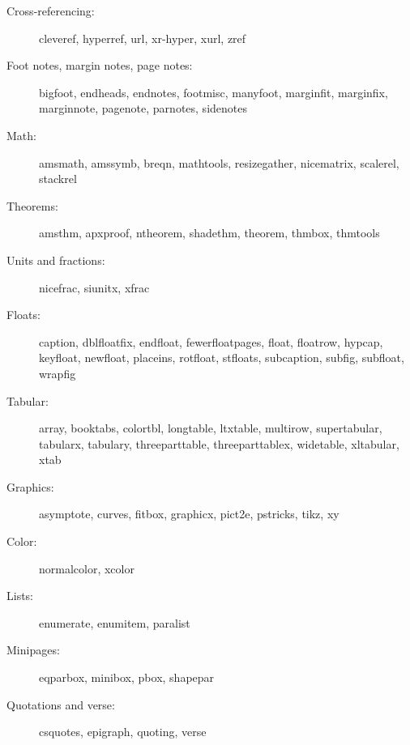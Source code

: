 \documentclass{article}
\def\pkg#1{#1}%
\renewcommand*{\pkg}[1]{#1}
\begin{document}
\begin{multicols}{2}
\begin{description}
\item[Cross-referencing:] \pkg{cleveref}, \pkg{hyperref}, \pkg{url}, \pkg{xr-hyper},
    \pkg{xurl}, \pkg{zref}

\item[Foot notes, margin notes, page notes:]
    \pkg{bigfoot}, \pkg{endheads}, \pkg{endnotes}, \pkg{footmisc},
    \pkg{manyfoot}, \pkg{marginfit}, \pkg{marginfix}, \pkg{marginnote},
    \pkg{pagenote}, \pkg{parnotes}, \pkg{sidenotes}

\item[Math:] \pkg{amsmath}, \pkg{amssymb}, \pkg{breqn}, \pkg{mathtools},
    \pkg{resizegather}, \pkg{nicematrix}, \pkg{scalerel}, \pkg{stackrel}

\item[Theorems:]
    \pkg{amsthm}, \pkg{apxproof}, \pkg{ntheorem}, \pkg{shadethm},
    \pkg{theorem}, \pkg{thmbox}, \pkg{thmtools}

\item[Units and fractions:] \pkg{nicefrac}, \pkg{siunitx}, \pkg{xfrac}

\item[Floats:] \pkg{caption}, \pkg{dblfloatfix}, \pkg{endfloat}, \pkg{fewerfloatpages},
    \pkg{float}, \pkg{floatrow}, \pkg{hypcap}, \pkg{keyfloat}, \pkg{newfloat},
    \pkg{placeins}, \pkg{rotfloat}, \pkg{stfloats}, \pkg{subcaption}, \pkg{subfig},
    \pkg{subfloat}, \pkg{wrapfig}

\item[Tabular:] \pkg{array}, \pkg{booktabs}, \pkg{colortbl}, \pkg{longtable},
    \pkg{ltxtable}, \pkg{multirow},
    \pkg{supertabular}, \pkg{tabularx}, \pkg{tabulary},
    \pkg{threeparttable}, \pkg{threeparttablex},
    \pkg{widetable}, \pkg{xltabular}, \pkg{xtab}

\item[Graphics:] \pkg{asymptote}, \pkg{curves}, \pkg{fitbox}, \pkg{graphicx},
    \pkg{pict2e}, \pkg{pstricks}, \pkg{tikz}, \pkg{xy}

\item[Color:] \pkg{normalcolor}, \pkg{xcolor}

\item[Lists:] \pkg{enumerate}, \pkg{enumitem}, \pkg{paralist}

\item[Minipages:] \pkg{eqparbox}, \pkg{minibox}, \pkg{pbox}, \pkg{shapepar}

\item[Quotations and verse:] \pkg{csquotes}, \pkg{epigraph}, \pkg{quoting}, \pkg{verse}


\end{description}
\end{multicols}
\end{document}
